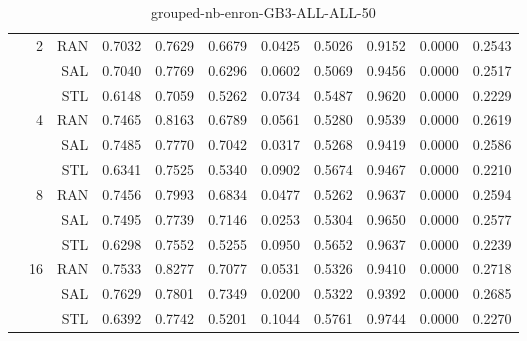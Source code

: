\begin{center}
\begin{table}[htbp]
\begin{center}
\begin{tabular}{ | r | r | r | r | r | r | r | r | r | r | r |}
 & \multirow{3}{*}{2} & RAN & 0.7032 & 0.7629 & 0.6679 & 0.0425 & 0.5026 & 0.9152 & 0.0000 & 0.2543\\ \cline{3-11}
 &   & SAL & 0.7040 & 0.7769 & 0.6296 & 0.0602 & 0.5069 & 0.9456 & 0.0000 & 0.2517\\ \cline{3-11}
 &   & STL & 0.6148 & 0.7059 & 0.5262 & 0.0734 & 0.5487 & 0.9620 & 0.0000 & 0.2229\\ \cline{2-11}
 & \multirow{3}{*}{4} & RAN & 0.7465 & 0.8163 & 0.6789 & 0.0561 & 0.5280 & 0.9539 & 0.0000 & 0.2619\\ \cline{3-11}
 &   & SAL & 0.7485 & 0.7770 & 0.7042 & 0.0317 & 0.5268 & 0.9419 & 0.0000 & 0.2586\\ \cline{3-11}
 &   & STL & 0.6341 & 0.7525 & 0.5340 & 0.0902 & 0.5674 & 0.9467 & 0.0000 & 0.2210\\ \cline{2-11}
 & \multirow{3}{*}{8} & RAN & 0.7456 & 0.7993 & 0.6834 & 0.0477 & 0.5262 & 0.9637 & 0.0000 & 0.2594\\ \cline{3-11}
 &   & SAL & 0.7495 & 0.7739 & 0.7146 & 0.0253 & 0.5304 & 0.9650 & 0.0000 & 0.2577\\ \cline{3-11}
 &   & STL & 0.6298 & 0.7552 & 0.5255 & 0.0950 & 0.5652 & 0.9637 & 0.0000 & 0.2239\\ \cline{2-11}
 & \multirow{3}{*}{16} & RAN & 0.7533 & 0.8277 & 0.7077 & 0.0531 & 0.5326 & 0.9410 & 0.0000 & 0.2718\\ \cline{3-11}
 &   & SAL & 0.7629 & 0.7801 & 0.7349 & 0.0200 & 0.5322 & 0.9392 & 0.0000 & 0.2685\\ \cline{3-11}
 &   & STL & 0.6392 & 0.7742 & 0.5201 & 0.1044 & 0.5761 & 0.9744 & 0.0000 & 0.2270\\ \cline{2-11}
\hline
\end{tabular}
\caption{grouped-nb-enron-GB3-ALL-ALL-50}
\end{center}
 \end{table}
\end{center}

